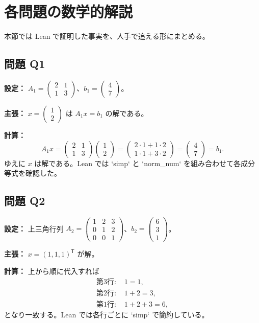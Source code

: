 \documentclass[a4paper]{ltjsarticle}
\begin{document}
\section{各問題の数学的解説}
本節では Lean で証明した事実を、人手で追える形にまとめる。

\subsection{問題 Q1}
\textbf{設定：} $A_1 = \begin{pmatrix}2 & 1\\ 1 & 3\end{pmatrix}$、$b_1 = \begin{pmatrix}4\\7\end{pmatrix}$。
\par
\textbf{主張：} $x = \begin{pmatrix}1\\2\end{pmatrix}$ は $A_1 x = b_1$ の解である。
\par
\textbf{計算：}
\[
A_1 x = \begin{pmatrix}2 & 1\\ 1 & 3\end{pmatrix}\begin{pmatrix}1\\2\end{pmatrix}
= \begin{pmatrix}2 \cdot 1 + 1 \cdot 2\\ 1 \cdot 1 + 3 \cdot 2\end{pmatrix}
= \begin{pmatrix}4\\7\end{pmatrix} = b_1.
\]
ゆえに $x$ は解である。Lean では `simp` と `norm_num` を組み合わせて各成分等式を確認した。

\subsection{問題 Q2}
\textbf{設定：} 上三角行列 $A_2 = \begin{pmatrix}1 & 2 & 3\\ 0 & 1 & 2\\ 0 & 0 & 1\end{pmatrix}$、$b_2 = \begin{pmatrix}6\\3\\1\end{pmatrix}$。
\par
\textbf{主張：} $x = (1,1,1)^\mathsf{T}$ が解。
\par
\textbf{計算：} 上から順に代入すれば
\begin{align*}
\text{第3行: } & 1 = 1,\\
\text{第2行: } & 1 + 2 = 3,\\
\text{第1行: } & 1 + 2 + 3 = 6,
\end{align*}
となり一致する。Lean では各行ごとに `simp` で簡約している。
\end{document}

